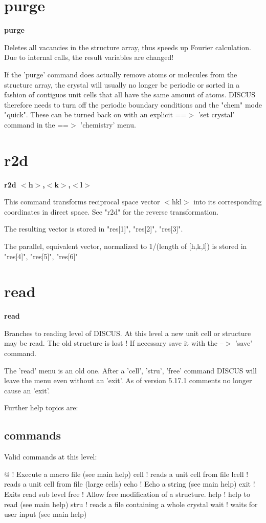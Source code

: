 \section{purge}
{\bf purge \par }
\par
\vspace{3pt}
Deletes all vacancies in the structure array, thus speeds up Fourier 
calculation. 
Due to internal calls, the result variables are changed! 
\par
If the 'purge' command does actually remove atoms or molecules 
from the structure array, the crystal will usually no longer be 
periodic or sorted in a fashion of contiguos unit cells that all 
have the same amount of atoms. DISCUS therefore needs to turn off 
the periodic boundary conditions and the "chem" mode "quick". 
These can be turned back on with an explicit 
==$> $ 'set crystal' command in the ==$> $ 'chemistry' menu. 
\section{r2d}
{\bf r2d $ <$h$> $,$ <$k$> $,$ <$l$> $ \par }
\par
\vspace{3pt}
This command transforms reciprocal space vector $ <$hkl$> $ into its corresponding 
coordinates in direct space. See "r2d" for the reverse transformation. 
\par
The resulting vector is stored in "res[1]", "res[2]", "res[3]". 
\par
The parallel, equivalent vector, normalized to 1/(length of [h,k,l]) 
is stored in "res[4]", "res[5]", "res[6]" 
\section{read}
{\bf read \par }
\par
\vspace{3pt}
Branches to reading level of DISCUS. At this level a new unit cell 
or structure may be read. The old structure is lost ! If necessary 
save it with the --$> $ 'save' command. 
\par
The 'read' menu is an old one. After a 'cell', 'stru', 'free' 
command DISCUS will leave the menu even without an 'exit'. 
As of version 5.17.1 comments no longer cause an 'exit'. 
\par
Further help topics are: 
\par
\subsection*{commands}
Valid commands at this level: 
\par
\begin{MacVerbatim}
@       ! Execute a macro file (see main help)
cell    ! reads a unit cell from file
lcell   ! reads a unit cell from file (large cells)
echo    ! Echo a string (see main help)
exit    ! Exits read sub level
free    ! Allow free modification of a structure.
help    ! help to read (see main help)
stru    ! reads a file containing a whole crystal
wait    ! waits for user input (see main help)
\end{MacVerbatim}

